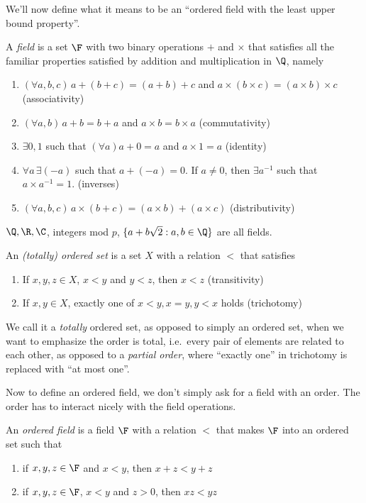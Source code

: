 \documentclass[a4paper]{article}
\begin{document}
We'll now define what it means to be an ``ordered field with the least upper bound property''.
\begin{defi}[Field]
  A \emph{field} is a set $\F$ with two binary operations $+$ and $\times$ that satisfies all the familiar properties satisfied by addition and multiplication in $\Q$, namely
  \begin{enumerate}
    \item $(\forall a, b, c)\,a + (b + c) = (a + b) + c$ and $a\times (b\times c) = (a\times b)\times c$ \hfill (associativity)
    \item $(\forall a, b)\,a + b = b + a$ and $a\times b= b\times a$ \hfill (commutativity)
    \item $\exists 0, 1$ such that $(\forall a)a + 0 = a$ and $a\times 1 = a$ \hfill (identity)
    \item $\forall a\,\exists (-a)$ such that $a + (-a) = 0$. If $a\not= 0$, then $\exists a^{-1}$ such that $a\times a^{-1} = 1$. \hfill (inverses)
    \item $(\forall a, b, c)\, a\times (b + c) = (a\times b) + (a\times c)$ \hfill (distributivity)
  \end{enumerate}
\end{defi}

\begin{eg}
  $\Q, \R, \C$, integers mod $p$, $\{a + b\sqrt{2}: a, b\in \Q\}$ are all fields.
\end{eg}

\begin{defi}
  An \emph{(totally) ordered set} is a set $X$ with a relation $<$ that satisfies
  \begin{enumerate}
    \item If $x, y, z\in X$, $x < y$ and $y < z$, then $x < z$ \hfill (transitivity)
    \item If $x, y\in X$, exactly one of $x < y, x = y, y < x$ holds \hfill (trichotomy)
  \end{enumerate}
\end{defi}
We call it a \emph{totally} ordered set, as opposed to simply an ordered set, when we want to emphasize the order is total, i.e.\ every pair of elements are related to each other, as opposed to a \emph{partial order}, where ``exactly one'' in trichotomy is replaced with ``at most one''.

Now to define an ordered field, we don't simply ask for a field with an order. The order has to interact nicely with the field operations.
\begin{defi}
  An \emph{ordered field} is a field $\F$ with a relation $<$ that makes $\F$ into an ordered set such that
  \begin{enumerate}
    \item if $x, y, z \in \F$ and $x < y$, then $x + z < y + z$
    \item if $x, y, z \in \F$, $x < y$ and $z > 0$, then $xz < yz$
  \end{enumerate}
\end{defi}
\end{document}
